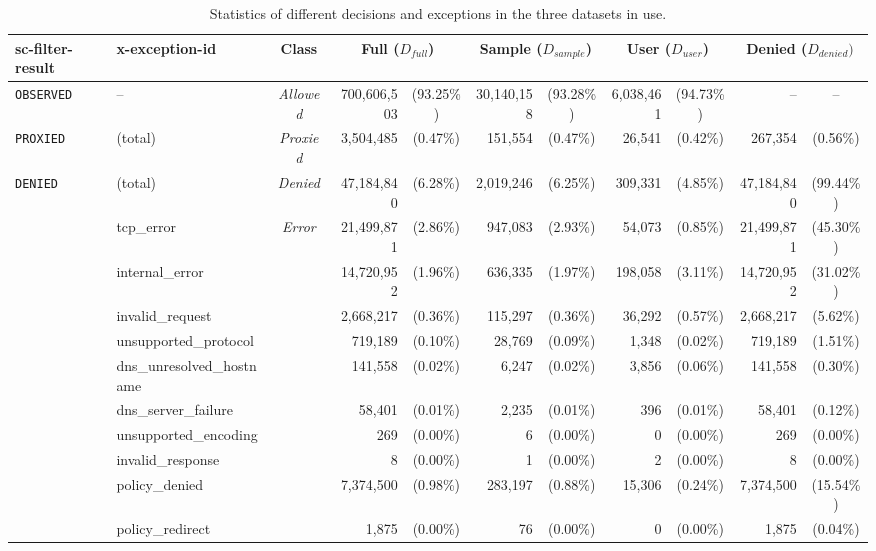 \documentclass{sig-alternate-2013}
\begin{document}
\begin{table*}[t!]
\centering
\small
\begin{tabular}{|l|l|l|c|r c|r c|r c|r c|}
			\hline
			\multicolumn{2}{|l|}{\bf sc-filter-result} & \bf{x-exception-id} & \bf{Class} & \multicolumn{2}{c|}{\bf Full ($D_{full}$)}  & \multicolumn{2}{c|}{\bf Sample ($D_{sample}$)} &
			\multicolumn{2}{c|}{\bf User ($D_{user}$)} & \multicolumn{2}{c|}{\bf Denied ($D_{denied})$}\\
			\hline
			\multicolumn{2}{|l|}{\texttt{OBSERVED}} & -- & \emph{Allowed}  &  700,606,503  & (93.25\%) & 30,140,158 & (93.28\%) & 6,038,461 & (94.73\%) & -- & -- \\
			\hline
			\multicolumn{2}{|l|}{\texttt{PROXIED}} & (total) & \emph{Proxied} &  3,504,485  & (0.47\%) & 151,554 & (0.47\%) & 26,541 & (0.42\%) & 267,354& (0.56\%) \\ \hline
			\multicolumn{2}{|l|}{\texttt{DENIED}} & (total) & \emph{Denied} &  47,184,840  & (6.28\%) &  2,019,246 & (6.25\%) & 309,331 & (4.85\%) & 47,184,840 & (99.44\%) \\ \cline{2-12} 
& \multicolumn{2}{l|}{tcp\_error} &\multirow{9}{*}{\emph{Error}} &  21,499,871  & (2.86\%) &  947,083 & (2.93\%) & 54,073 & (0.85\%) & 21,499,871 & (45.30\%)  \\
& \multicolumn{2}{l|}{internal\_error} & &  14,720,952  & (1.96\%) & 636,335 & (1.97\%) & 198,058 & (3.11\%) & 14,720,952 & (31.02\%)  \\
& \multicolumn{2}{l|}{invalid\_request} & &  2,668,217  & (0.36\%) & 115,297 & (0.36\%) & 36,292 & (0.57\%) & 2,668,217 & (5.62\%)  \\
& \multicolumn{2}{l|}{unsupported\_protocol} & &  719,189  & (0.10\%) & 28,769 & (0.09\%) & 1,348 & (0.02\%) & 719,189 & (1.51\%)  \\ 
& \multicolumn{2}{l|}{dns\_unresolved\_hostname} & &   141,558  & (0.02\%) & 6,247 & (0.02\%) & 3,856 & (0.06\%) & 141,558 & (0.30\%)  \\


			& \multicolumn{2}{l|}{dns\_server\_failure} &  &  58,401  & (0.01\%) & 2,235 & (0.01\%) & 396 & (0.01\%) & 58,401 & (0.12\%)  \\ 
& \multicolumn{2}{l|}{unsupported\_encoding} & &  269  & (0.00\%) & 6 & (0.00\%) & 0 & (0.00\%) & 269 & (0.00\%)  \\ 
			& \multicolumn{2}{l|}{invalid\_response} & & 8 & (0.00\%) & 1 & (0.00\%) & 2 & (0.00\%) & 8 & (0.00\%)  \\  \cline{2-12} 

& \multicolumn{2}{l|}{policy\_denied} & \multirow{2}{*}{\emph{Censored}} &   7,374,500  & (0.98\%) & 283,197 & (0.88\%) & 15,306 & (0.24\%) & 7,374,500 & (15.54\%)  \\ 
& \multicolumn{2}{l|}{policy\_redirect} & &  1,875  &(0.00\%) & 76 & (0.00\%) & 0 & (0.00\%) & 1,875 & (0.04\%)  \\ 

		\hline
		\end{tabular}
\caption{Statistics of different decisions and exceptions in the three datasets in use.}
\label{tab:exception}
\end{table*}
\end{document}
